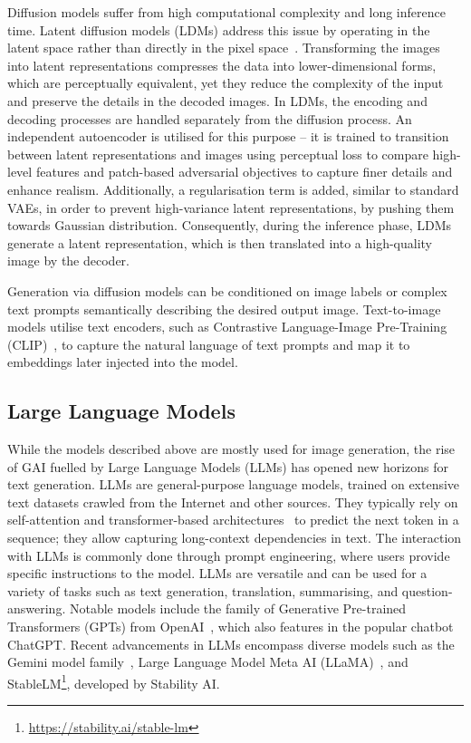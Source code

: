 \documentclass[conference,table]{IEEEtran} %
\begin{document}
Diffusion models suffer from high computational complexity and long inference time. Latent diffusion models (LDMs) address this issue by operating in the latent space rather than directly in the pixel space~\cite{rombach_high-resolution_2022}. Transforming the images into latent representations compresses the data into lower-dimensional forms, which are perceptually equivalent, yet they reduce the complexity of the input and preserve the details in the decoded images.
In LDMs, the encoding and decoding processes are handled separately from the diffusion process. An independent autoencoder is utilised for this purpose -- it is trained to transition between latent representations and images using perceptual loss to compare high-level features and patch-based adversarial objectives to capture finer details and enhance realism. 
Additionally, a regularisation term is added, similar to standard VAEs, in order to prevent high-variance latent representations, by pushing them towards Gaussian distribution. 
Consequently, during the inference phase, LDMs generate a latent representation, which is then translated into a high-quality image by the decoder.

Generation via diffusion models can be conditioned on image labels or complex text prompts semantically describing the desired output image. Text-to-image models utilise text encoders, such as Contrastive Language-Image Pre-Training (CLIP)~\cite{radford_learning_2021}, to capture the natural language of text prompts and map it to embeddings later injected into the model.

\subsection{Large Language Models}
While the models described above are mostly used for image generation, the rise of GAI fuelled by Large Language Models (LLMs) has opened new horizons for text generation. LLMs are general-purpose language models, trained on extensive text datasets crawled from the Internet and other sources. They typically rely on self-attention and transformer-based architectures~\cite{vaswani_attention_2017} to predict the next token in a sequence; they allow capturing long-context dependencies in text. The interaction with LLMs is commonly done through prompt engineering, where users provide specific instructions to the model. LLMs are versatile and can be used for a variety of tasks such as text generation, translation, summarising, and question-answering. Notable models include the family of Generative Pre-trained Transformers (GPTs) from OpenAI~\cite{radford_improving_nodate, openai_gpt-4_2023}, which also features in the popular chatbot ChatGPT. 
Recent advancements in LLMs encompass diverse models such as the Gemini model family~\cite{gemini_team_gemini_2023}, Large Language Model Meta AI (LLaMA)~\cite{touvron_llama_2023}, and StableLM\footnote{\url{https://stability.ai/stable-lm}}, developed by Stability AI.
\end{document}
